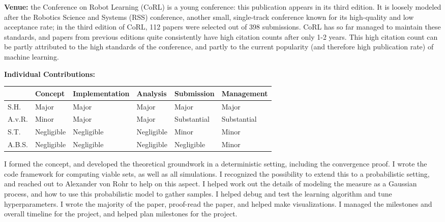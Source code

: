 \textbf{Venue: }
the Conference on Robot Learning (CoRL) is a young conference: this publication appears in its third edition. It is loosely modeled after the Robotics Science and Systems (RSS) conference, another small, single-track conference known for its high-quality and low acceptance rate; in the third edition of CoRL, 112 papers were selected out of 398 submissions. CoRL has so far managed to maintain these standards, and papers from previous editions quite consistently have high citation counts after only 1-2 years. This high citation count can be partly attributed to the high standards of the conference, and partly to the current popularity (and therefore high publication rate) of machine learning. \par
\textbf{Individual Contributions: }
\begin{table}[h!]
\begin{tabular}{l|l|l|l|l|l|}
\cline{2-6}
\textbf{} & \textbf{Concept} & {\footnotesize \textbf{Implementation}} & \textbf{Analysis} & \textbf{Submission} & {\footnotesize \textbf{Management}} \\ \hline
\multicolumn{1}{|l|}{S.H.} & Major & Major & Major & Major & Major \\ \hline
\multicolumn{1}{|l|}{A.v.R.} & Minor & Major & Major & Substantial & Substantial \\ \hline
\multicolumn{1}{|l|}{S.T.} & Negligible & Negligible & Negligible & Minor & Minor \\ \hline
\multicolumn{1}{|l|}{A.B.S.} & Negligible & Negligible & Negligible & Negligible & Minor \\ \hline
\end{tabular}
\end{table}

I formed the concept, and developed the theoretical groundwork in a deterministic setting, including the convergence proof. I wrote the code framework for computing viable sets, as well as all simulations. I recognized the possibility to extend this to a probabilistic setting, and reached out to Alexander von Rohr to help on this aspect. I helped work out the details of modeling the measure as a Gaussian process, and how to use this probabilistic model to gather samples. I helped debug and test the learning algorithm and tune hyperparameters. I wrote the majority of the paper, proof-read the paper, and helped make visualizations. I managed the milestones and overall timeline for the project, and helped plan milestones for the project. \\

